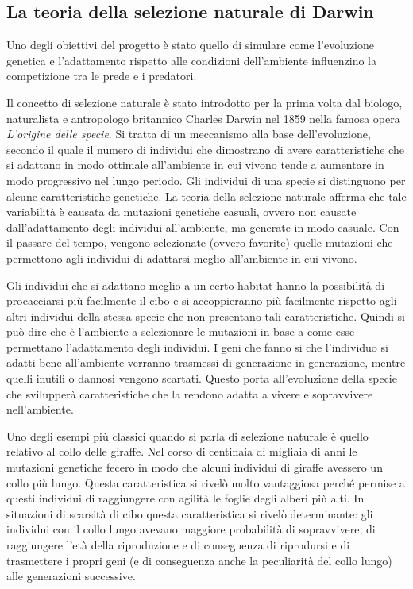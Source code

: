 \documentclass[11pt]{article}
\begin{document}
\subsection{La teoria della selezione naturale di Darwin}
Uno degli obiettivi del progetto è stato quello di simulare come l'evoluzione genetica e l'adattamento rispetto alle condizioni dell'ambiente influenzino la competizione tra le prede e i predatori. 

Il concetto di selezione naturale è stato introdotto per la prima volta dal biologo, naturalista e antropologo britannico Charles Darwin nel 1859 nella famosa opera \emph{L'origine delle specie}\cite{darwin1859}. Si tratta di un meccanismo alla base dell'evoluzione, secondo il quale il numero di individui che dimostrano di avere caratteristiche che si adattano in modo ottimale all'ambiente in cui vivono tende a aumentare in modo progressivo nel lungo periodo.
Gli individui di una specie si distinguono per alcune caratteristiche genetiche. La teoria della selezione naturale afferma che tale variabilità è causata da mutazioni genetiche casuali, ovvero non causate dall'adattamento degli individui all'ambiente, ma generate in modo casuale. Con il passare del tempo, vengono selezionate (ovvero favorite) quelle mutazioni che permettono agli individui di adattarsi meglio all'ambiente in cui vivono. 

Gli individui che si adattano meglio a un certo habitat hanno la possibilità di procacciarsi più facilmente il cibo e si accoppieranno più facilmente rispetto agli altri individui della stessa specie che non presentano tali caratteristiche. Quindi si può dire che è l'ambiente a selezionare le mutazioni in base a come esse permettano l'adattamento degli individui. I geni che fanno si che l'individuo si adatti bene all'ambiente verranno trasmessi di generazione in generazione, mentre quelli inutili o dannosi vengono scartati. Questo porta all'evoluzione della specie che svilupperà caratteristiche che la rendono adatta a vivere e sopravvivere nell'ambiente. 

Uno degli esempi più classici quando si parla di selezione naturale è quello relativo al collo delle giraffe. Nel corso di centinaia di migliaia di anni le mutazioni genetiche fecero in modo che alcuni individui di giraffe avessero un collo più lungo. Questa caratteristica si rivelò molto vantaggiosa perché permise a questi individui di raggiungere con agilità le foglie degli alberi più alti. In situazioni di scarsità di cibo questa caratteristica si rivelò determinante: gli individui con il collo lungo avevano maggiore probabilità di sopravvivere, di raggiungere l'età della riproduzione e di conseguenza di riprodursi e di trasmettere i propri geni (e di conseguenza anche la peculiarità del collo lungo) alle generazioni successive. 
\end{document}

